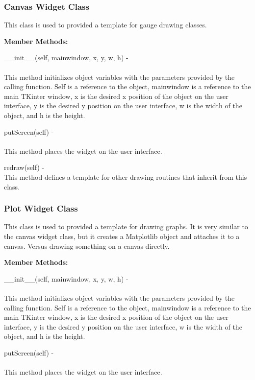 \documentclass[10pt,draftclsnofoot,onecolumn,compsoc]{IEEEtran}
\begin{document}
\subsubsection{Canvas Widget Class}
This class is used to provided a template for gauge drawing classes.

{\bf Member Methods:} \par

 \_\_init\_\_(self, mainwindow, x, y, w, h) - \\ \\
This method initializes object variables with the parameters provided by the calling function. Self is a reference to the object, mainwindow is a reference to the main TKinter window, x is the desired x position of the object on the user interface, y is the desired y position on the user interface, w is the width of the object, and h is the height. \par

putScreen(self) - \\ \\
This method places the widget on the user interface. \par

redraw(self) - \\
This method defines a template for other drawing routines that inherit from this class.

\subsubsection{Plot Widget Class}
This class is used to provided a template for drawing graphs. It is very similar to the canvas widget class, but it creates a Matplotlib object and attaches it to a canvas. Versus drawing something on a canvas directly.

{\bf Member Methods:} \par

 \_\_init\_\_(self, mainwindow, x, y, w, h) - \\ \\
This method initializes object variables with the parameters provided by the calling function. Self is a reference to the object, mainwindow is a reference to the main TKinter window, x is the desired x position of the object on the user interface, y is the desired y position on the user interface, w is the width of the object, and h is the height. \par

putScreen(self) - \\ \\
This method places the widget on the user interface. \par
\end{document}
